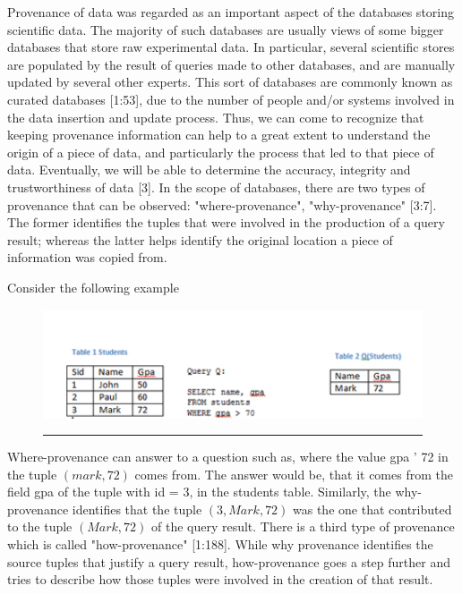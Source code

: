 Provenance of data was regarded as an important aspect of the databases storing scientific data. The majority of such databases are usually views of some bigger databases that store raw experimental data. In particular, several scientific stores are populated by the result of queries made to other databases, and are manually updated by several other experts. This sort of databases are commonly known as curated databases [1:53], due to the number of people and/or systems involved in the data insertion and update process. Thus, we can come to recognize that keeping provenance information can help to a great extent to understand the origin of a piece of data, and particularly the process that led to that piece of data. Eventually, we will be able to determine the accuracy, integrity and trustworthiness of data [3].
In the scope of databases, there are two types of provenance that can be observed: "where-provenance", "why-provenance" [3:7]. The former identifies the tuples that were involved in the production of a query result; whereas the latter helps identify the original location a piece of information was copied from.

Consider the following example

\begin{figure}[htbp]
	\centering
		\includegraphics{./Figures/table.pdf}
		\rule{35em}{0.5pt}
	\label{fig:scientificWorkflow}
\end{figure}


Where-provenance can answer to a question such as, where the value gpa ' 72 in the tuple $(mark, 72)$ comes from. The answer would be, that it comes from the field gpa of the tuple with id = 3, in the students table.  Similarly, the why-provenance identifies that the tuple $(3, Mark, 72)$ was the one that contributed to the tuple $(Mark, 72)$ of the query result.
There is a third type of provenance which is called "how-provenance" [1:188]. While why provenance identifies the source tuples that justify a query result, how-provenance goes a step further and tries to describe how those tuples were involved in the creation of that result.

